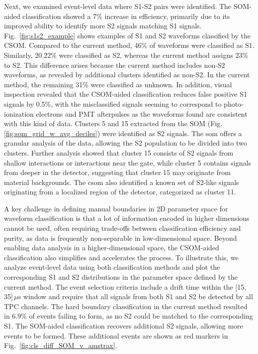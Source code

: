 Next, we examined event-level data where S1-S2 pairs were identified. The SOM-aided classification showed a 7\% increase in efficiency, primarily due to its improved ability to identify more S2 signals matching S1 signals. Fig.~\ref{fig:s1s2_example} shows examples of S1 and S2 waveforms classified by the CSOM. Compared to the current method, 46\% of waveforms were classified as S1. Similarly, 20.22\% were classified as S2, whereas the current method assigns 23\% to S2. This difference arises because the current method includes non-S2 waveforms, as revealed by additional clusters identified as non-S2. In the current method, the remaining 31\% were classified as unknown. In addition, visual inspection revealed that the CSOM-aided classification reduces false positive S1 signals by 0.5\%, with the misclassified signals seeming to correspond to photo-ionization electrons and PMT afterpulses as the waveforms found are consistent with this kind of data. Clusters 5 and 15 extracted from the SOM (Fig.\,\ref{fig:som_grid_w_avg_deciles}) were identified as S2 signals. The \acrshort{som} offers a granular analysis of the data, allowing the S2 population to be divided into two clusters. Further analysis showed that cluster 15 consists of S2 signals from shallow interactions or interactions near the gate, while cluster 5 contains signals from deeper in the detector, suggesting that cluster 15 may originate from material backgrounds. The \acrshort{csom} also identified a known set of S2-like signals originating from a localized region of the detector, categorized as cluster 11.


A key challenge in defining manual boundaries in 2D parameter space for waveform classification is that a lot of information encoded in higher dimensions cannot be used, often requiring trade-offs between classification efficiency and purity, as data is frequently non-separable in low-dimensional space. Beyond enabling data analysis in a higher-dimensional space, the CSOM-aided classification also simplifies and accelerates the process. To illustrate this, we analyze event-level data using both classification methods and plot the corresponding S1 and S2 distributions in the parameter space defined by the current method. The event selection criteria include a drift time within the [15, 35]\,$\mu$s window and require that all signals from both S1 and S2 be detected by all TPC channels. The hard boundary classification in the current method resulted in 6.9\% of events failing to form, as no S2 could be matched to the corresponding S1. The SOM-aided classification recovers additional S2 signals, allowing more events to be formed. These additional events are shown as red markers in Fig.~\ref{fig:cls_diff_SOM_v_amstrax}.


